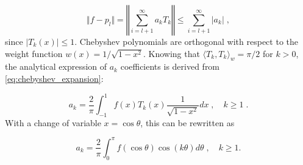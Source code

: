 \documentclass{article}
\begin{document}
\begin{equation*}
    \Vert f - p_l \Vert = \left\Vert \textstyle\sum_{i=l+1}^\infty a_k T_k \right\Vert \le \sum_{i=l+1}^\infty |a_k| \;,
\end{equation*}
%
since $|T_k(x)| \le 1$. Chebyshev polynomials are orthogonal with respect to the weight function $w(x) = 1/\sqrt{1-x^2}$. Knowing that $\langle T_k, T_k\rangle _w = \pi/2$ for $k > 0$, the analytical expression of $a_k$ coefficients is derived from \eqref{eq:chebyshev_expansion}:

\begin{equation} \label{eq:chebyshev_coef}
    a_k = \frac{2}{\pi} \int_{-1}^1 f(x) T_k(x) \frac{1}{\sqrt{1-x^2}} dx \; , \quad k \ge 1 \; .
\end{equation}
%
With a change of variable $x = \cos \theta$, this can be rewritten as

\begin{equation} \label{eq:chebyshev_coef_cos}
    a_k = \frac{2}{\pi} \int_0^\pi f(\cos\theta) \cos(k\theta) d\theta \;, \quad k \ge 1 .
\end{equation}

\end{document}
